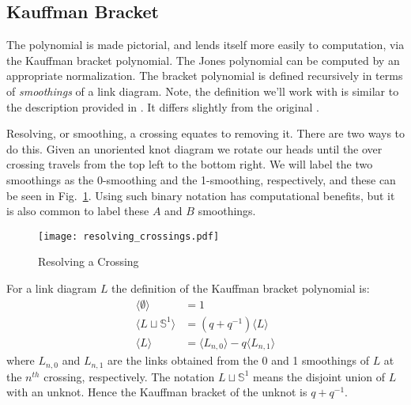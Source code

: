     \subsection{Kauffman Bracket}
        The polynomial is made pictorial, and lends itself more easily
        to computation, via the Kauffman bracket polynomial. The Jones
        polynomial can be computed by an appropriate normalization. The bracket
        polynomial is defined recursively in terms of
        \textit{smoothings} of a link diagram. Note, the definition we'll work
        with is similar to the description provided in
        \cite{BarNatan2002khovanov}. It differs slightly from the original
        \cite{KauffmanStateModels}.
        \par\hfill\par
        Resolving, or smoothing, a crossing equates to removing it.
        There are two ways to do this. Given an unoriented knot diagram
        we rotate our heads until the over crossing travels from the top left
        to the bottom right. We will label the two smoothings as the
        0-smoothing and the 1-smoothing, respectively, and these can be seen
        in Fig.~\ref{fig:resolving_crossing}. Using such binary notation has
        computational benefits, but it is also common to label these $A$ and
        $B$ smoothings.
        \begin{figure}
            \centering
            \texttt{[image: resolving\_crossings.pdf]}
            \caption{Resolving a Crossing}
            \label{fig:resolving_crossing}
        \end{figure}
        \par\hfill\par
        For a link diagram $L$ the definition of the Kauffman bracket
        polynomial is:
        \begin{align}
            \label{eqn:kauffman_bracket}
            \langle\emptyset\rangle&=1\\
            \langle{L\sqcup\mathbb{S}^{1}}\rangle&=(q+q^{-1})\langle{L}\rangle\\
            \langle{L}\rangle&=
                \langle{L_{n,0}}\rangle-q\langle{L_{n,1}}\rangle
        \end{align}
        where $L_{n,0}$ and $L_{n,1}$ are the links obtained from the
        0 and 1 smoothings of $L$ at the $n^{th}$ crossing, respectively. The
        notation $L\sqcup\mathbb{S}^{1}$ means the disjoint union of
        $L$ with an unknot. Hence the Kauffman bracket of the
        unknot is $q+q^{-1}$.
